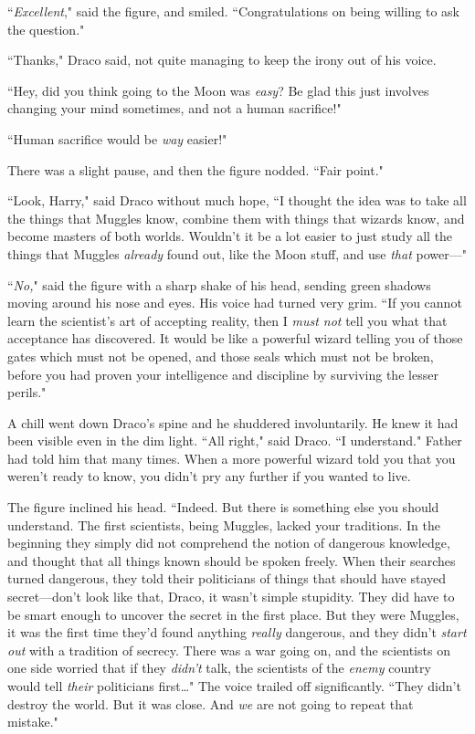 ``\emph{Excellent}," said the figure, and smiled. ``Congratulations on being willing to ask the question."

``Thanks," Draco said, not quite managing to keep the irony out of his voice.

``Hey, did you think going to the Moon was \emph{easy}? Be glad this just involves changing your mind sometimes, and not a human sacrifice!"

``Human sacrifice would be \emph{way} easier!"

There was a slight pause, and then the figure nodded. ``Fair point."

``Look, Harry," said Draco without much hope, ``I thought the idea was to take all the things that Muggles know, combine them with things that wizards know, and become masters of both worlds. Wouldn't it be a lot easier to just study all the things that Muggles \emph{already} found out, like the Moon stuff, and use \emph{that} power---"

``\emph{No,}" said the figure with a sharp shake of his head, sending green shadows moving around his nose and eyes. His voice had turned very grim. ``If you cannot learn the scientist's art of accepting reality, then I \emph{must not} tell you what that acceptance has discovered. It would be like a powerful wizard telling you of those gates which must not be opened, and those seals which must not be broken, before you had proven your intelligence and discipline by surviving the lesser perils."

A chill went down Draco's spine and he shuddered involuntarily. He knew it had been visible even in the dim light. ``All right," said Draco. ``I understand." Father had told him that many times. When a more powerful wizard told you that you weren't ready to know, you didn't pry any further if you wanted to live.

The figure inclined his head. ``Indeed. But there is something else you should understand. The first scientists, being Muggles, lacked your traditions. In the beginning they simply did not comprehend the notion of dangerous knowledge, and thought that all things known should be spoken freely. When their searches turned dangerous, they told their politicians of things that should have stayed secret---don't look like that, Draco, it wasn't simple stupidity. They did have to be smart enough to uncover the secret in the first place. But they were Muggles, it was the first time they'd found anything \emph{really} dangerous, and they didn't \emph{start out} with a tradition of secrecy. There was a war going on, and the scientists on one side worried that if they \emph{didn't} talk, the scientists of the \emph{enemy} country would tell \emph{their} politicians first{\ldots}" The voice trailed off significantly. ``They didn't destroy the world. But it was close. And \emph{we} are not going to repeat that mistake."

